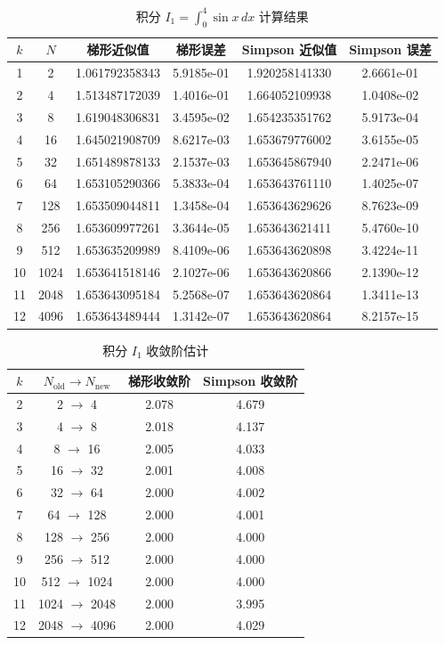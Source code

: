 \documentclass[12pt,a4paper]{article}
\begin{document}
\begin{table}[htbp]
\centering
\caption{积分 \(I_1 = \int_0^4 \sin x\,dx\) 计算结果}
\label{tab:I1}
\begin{tabular}{c c c c c c}
\toprule
\(k\) & \(N\) & 梯形近似值 & 梯形误差 & Simpson 近似值 & Simpson 误差 \\
\midrule
1 & 2 & 1.061792358343 & 5.9185e-01 & 1.920258141330 & 2.6661e-01 \\
2 & 4 & 1.513487172039 & 1.4016e-01 & 1.664052109938 & 1.0408e-02 \\
3 & 8 & 1.619048306831 & 3.4595e-02 & 1.654235351762 & 5.9173e-04 \\
4 & 16 & 1.645021908709 & 8.6217e-03 & 1.653679776002 & 3.6155e-05 \\
5 & 32 & 1.651489878133 & 2.1537e-03 & 1.653645867940 & 2.2471e-06 \\
6 & 64 & 1.653105290366 & 5.3833e-04 & 1.653643761110 & 1.4025e-07 \\
7 & 128 & 1.653509044811 & 1.3458e-04 & 1.653643629626 & 8.7623e-09 \\
8 & 256 & 1.653609977261 & 3.3644e-05 & 1.653643621411 & 5.4760e-10 \\
9 & 512 & 1.653635209989 & 8.4109e-06 & 1.653643620898 & 3.4224e-11 \\
10 & 1024 & 1.653641518146 & 2.1027e-06 & 1.653643620866 & 2.1390e-12 \\
11 & 2048 & 1.653643095184 & 5.2568e-07 & 1.653643620864 & 1.3411e-13 \\
12 & 4096 & 1.653643489444 & 1.3142e-07 & 1.653643620864 & 8.2157e-15 \\
\bottomrule
\end{tabular}
\end{table}

\begin{table}[htbp]
\centering
\caption{积分 \(I_1\) 收敛阶估计}
\label{tab:I1_order}
\begin{tabular}{c c c c}
\toprule
\(k\) & \(N_{\text{old}}\to N_{\text{new}}\) & 梯形收敛阶 & Simpson 收敛阶 \\
\midrule
2 & 2 \(\to\) 4 & 2.078 & 4.679 \\
3 & 4 \(\to\) 8 & 2.018 & 4.137 \\
4 & 8 \(\to\) 16 & 2.005 & 4.033 \\
5 & 16 \(\to\) 32 & 2.001 & 4.008 \\
6 & 32 \(\to\) 64 & 2.000 & 4.002 \\
7 & 64 \(\to\) 128 & 2.000 & 4.001 \\
8 & 128 \(\to\) 256 & 2.000 & 4.000 \\
9 & 256 \(\to\) 512 & 2.000 & 4.000 \\
10 & 512 \(\to\) 1024 & 2.000 & 4.000 \\
11 & 1024 \(\to\) 2048 & 2.000 & 3.995 \\
12 & 2048 \(\to\) 4096 & 2.000 & 4.029 \\
\bottomrule
\end{tabular}
\end{table}
\end{document}
